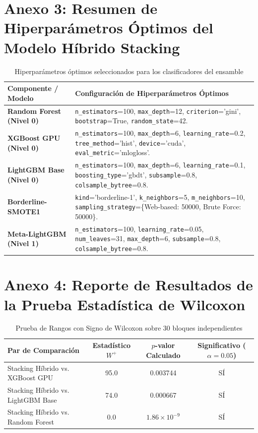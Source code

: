 \section*{Anexo 3: Resumen de Hiperparámetros Óptimos del Modelo Híbrido Stacking}
\begin{table}[H]
\centering
\caption{Hiperparámetros óptimos seleccionados para los clasificadores del ensamble}
\label{tab:hiperparametros_anexo2}
\small



\begin{tabularx}{\textwidth}{p{4.0cm} p{10.0cm}}
\toprule
\textbf{Componente / Modelo} & \textbf{Configuración de Hiperparámetros Óptimos} \\
\midrule
\textbf{Random Forest (Nivel 0)} & \texttt{n\_estimators}=100, \texttt{max\_depth}=12, \texttt{criterion}='gini', \texttt{bootstrap}=True, \texttt{random\_state}=42. \\
\textbf{XGBoost GPU (Nivel 0)} & \texttt{n\_estimators}=100, \texttt{max\_depth}=6, \texttt{learning\_rate}=0.2, \texttt{tree\_method}='hist', \texttt{device}='cuda', \texttt{eval\_metric}='mlogloss'. \\
\textbf{LightGBM Base (Nivel 0)} & \texttt{n\_estimators}=100, \texttt{max\_depth}=6, \texttt{learning\_rate}=0.1, \texttt{boosting\_type}='gbdt', \texttt{subsample}=0.8, \texttt{colsample\_bytree}=0.8. \\
\textbf{Borderline-SMOTE1} & \texttt{kind}='borderline-1', \texttt{k\_neighbors}=5, \texttt{m\_neighbors}=10, \texttt{sampling\_strategy}=\{Web-based: 50000, Brute Force: 50000\}. \\
\textbf{Meta-LightGBM (Nivel 1)} & \texttt{n\_estimators}=100, \texttt{learning\_rate}=0.05, \texttt{num\_leaves}=31, \texttt{max\_depth}=6, \texttt{subsample}=0.8, \texttt{colsample\_bytree}=0.8. \\
\bottomrule
\end{tabularx}
\end{table}

\vspace{0.8em}
\section*{Anexo 4: Reporte de Resultados de la Prueba Estadística de Wilcoxon}
\begin{table}[H]
\centering
\caption{Prueba de Rangos con Signo de Wilcoxon sobre 30 bloques independientes}
\label{tab:wilcoxon_anexo2}
\small



\begin{tabularx}{\textwidth}{p{5.0cm} c c c}
\toprule
\textbf{Par de Comparación} & \textbf{Estadístico $W^+$} & \textbf{$p$-valor Calculado} & \textbf{Significativo ($\alpha=0.05$)} \\
\midrule
Stacking Híbrido vs. XGBoost GPU & 95.0 & 0.003744 & SÍ \\
Stacking Híbrido vs. LightGBM Base & 74.0 & 0.000667 & SÍ \\
Stacking Híbrido vs. Random Forest & 0.0 & $1.86 \times 10^{-9}$ & SÍ \\
\bottomrule
\end{tabularx}
\end{table}

